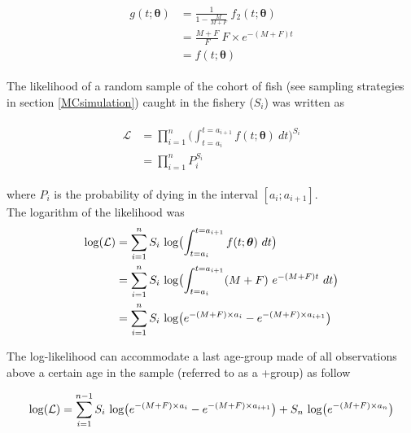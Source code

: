 \documentclass[12pt]{article}
\begin{document}
\begin{align}
\begin{split}
g(t; \bm{\theta}) &= \frac{1}{1 - \frac{M}{M+F}} \ f_{2}(t; \bm{\theta}) \\
             &= \frac{M+F}{F} \ F \times e^{-(M+F)t} \\
             &= f(t; \bm{\theta})
\end{split}
\end{align} 

The likelihood \citep{edwards1992likelihood} of a random sample of the cohort of fish (see sampling strategies in section \ref{MCsimulation}) caught in the fishery ($S_{i}$) was written as 

\begin{align}
\begin{split}
\mathcal{L}  &= \prod_{i=1}^{n} \bigl ( \int_{t=a_{i}}^{t=a_{i+1}} f(t; \bm{\theta}) \ dt \bigr ) ^ {S_{i}} \\
            &= \prod_{i=1}^{n} P_{i} ^ {S_{i}}
\end{split}
\end{align}

\noindent where $P_{i}$ is the probability of dying in the interval $[a_{i}; a_{i+1}]$.\\

The logarithm of the likelihood was
\begin{align}
\begin{split}
{\rm log}(\mathcal{L}) &= \sum_{i=1}^{n} S_{i} \ {\rm log} \bigl ( \int_{t=a_{i}}^{t=a_{i+1}} f(t; \bm{\theta}) \ dt \bigr ) \\
                       &= \sum_{i=1}^{n} S_{i} \ {\rm log} \bigl ( \int_{t=a_{i}}^{t=a_{i+1}} (M + F) \ e^{-(M+F)t} \ dt \bigr ) \\
                       &= \sum_{i=1}^{n} S_{i} \ {\rm log} \bigl ( e^{-(M+F) \times a_{i}} - e^{-(M+F) \times a_{i+1}} \bigr )
\label{eq:16}
\end{split}
\end{align}

The log-likelihood can accommodate a last age-group made of all observations above a certain age in the sample (referred to as a +group) as follow \citep{pawitan2013all}

\begin{equation}
{\rm log}(\mathcal{L}) = \sum_{i=1}^{n-1} S_{i} \ {\rm log} \bigl ( e^{-(M+F) \times a_{i}} - e^{-(M+F) \times a_{i+1}} \bigr ) + S_{n} \ {\rm log} \bigl ( e^{-(M+F) \times a_{n}} \bigr )
\end{equation}
\end{document}
